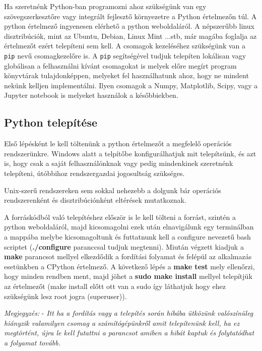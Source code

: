 
Ha szeretnénk Python-ban programozni ahoz szükségünk van egy
szövegszerkesztőre vagy integrált fejlesztő környezetre a Python
értelmezőn túl. A python értelmező ingyenesen elérhető a python
weboldaláról. A népszerűbb linux disztribúciók, mint az Ubuntu, Debian,
Linux Mint ...stb, már magába foglalja az értelmezőt ezért telepíteni
sem kell. A csomagok kezeléséhez szükségünk van a \texttt{pip} nevű
csomagkezelőre is. A \texttt{pip} segítségével tudjuk telepíten
lokálisan vagy globálisan a felhasználni kívánt csomagokat is melyek
előre megírt program könyvtárak tulajdonképpen, melyeket fel
használhatunk ahoz, hogy ne mindent nekünk kelljen implementálni. Ilyen
csomagok a Numpy, Matplotlib, Scipy, vagy a Jupyter notebook is melyeket
használok a későbbiekben.

    \subsection{Python telepítése}\label{python-telepuxedtuxe9se}

    Első lépésként le kell töltenünk a python értelmezőt a megfelelő
operációs rendszerünkre. Windows alatt a telpítőbe konfigurálhatjuk mit
telepítsünk, és azt is, hogy csak a saját felhasználónknak vagy pedig
mindenkinek szeretnénk telepíteni, útóbbihoz rendszergazdai jogosultság
szükséges.

Unix-szerű rendszereken sem sokkal nehezebb a dolgunk bár operációs
rendszerenként és disztribúciónként eltérések mutatkoznak.

A forráskódból való telepítéshez először is le kell tölteni a forrást,
szintén a python weboldaláról, majd kicsomagolni ezek után elnavigálunk
egy terminálban a mappába melybe kicsomagoltunk és futtatnunk kell a
configure nevezetű bash scriptet (\textbf{./configure} paranccsal tudjuk
megtenni). Miután végzett kiadjuk a \textbf{make} parancsot mellyel
elkezdődik a fordítási folyamat és felépül az alkalmazás esetünkben a
CPython értelmező. A következő lépés a \textbf{make test} mely
ellenőrzi, hogy minden rendben ment, majd jöhet a \textbf{sudo make
install} mellyel telepítjük az értelmezőt (make install előtt ott van a
sudo így láthatjuk hogy ehez szükségünk lesz root jogra (superuser)).

\emph{Megjegyzés:} - \emph{Itt ha a fordítás vagy a telepítés során
hibába ütközünk valószínüleg hiányzik valamilyen csomag a
számítógépünkről amit telepítenünk kell, ha ez megtörtént, újra le kell
futattni a parancsot amiben a hibát kaptuk és folytatódhat a folyamat
tovább.}

